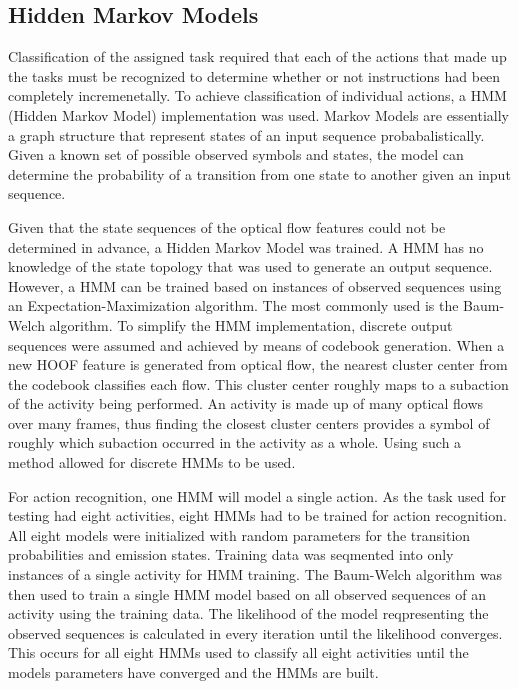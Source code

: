 \documentclass[10pt,twocolumn,letterpaper]{article}
\begin{document}
\subsection{Hidden Markov Models}
Classification of the assigned task required that each of the actions that made up the tasks must be recognized to determine whether or not instructions had been completely incremenetally. To achieve classification of individual actions, a HMM (Hidden Markov Model) implementation was used. Markov Models are essentially a graph structure that represent states of an input sequence probabalistically. Given a known set of possible observed symbols and states, the model can determine the probability of a transition from one state to another given an input sequence.

Given that the state sequences of the optical flow features could not be determined in advance, a Hidden Markov Model was trained. A HMM has no knowledge of the state topology that was used to generate an output sequence. However, a HMM can be trained based on instances of observed sequences using an Expectation-Maximization algorithm. The most commonly used is the Baum-Welch algorithm\cite{welch2003hidden}. To simplify the HMM implementation, discrete output sequences were assumed and achieved by means of codebook generation. When a new HOOF feature is generated from optical flow, the nearest cluster center from the codebook classifies each flow. This cluster center roughly maps to a subaction of the activity being performed. An activity is made up of many optical flows over many frames, thus finding the closest cluster centers provides a symbol of roughly which subaction occurred in the activity as a whole. Using such a method allowed for discrete HMMs to be used.

For action recognition, one HMM will model a single action. As the task used for testing had eight activities, eight HMMs had to be trained for action recognition. All eight models were initialized with random parameters for the transition probabilities and emission states. Training data was seqmented into only instances of a single activity for HMM training. The Baum-Welch algorithm was then used to train a single HMM model based on all observed sequences of an activity using the training data. The likelihood of the model reqpresenting the observed sequences is calculated in every iteration until the likelihood converges. This occurs for all eight HMMs used to classify all eight activities until the models parameters have converged and the HMMs are built.
\end{document}
